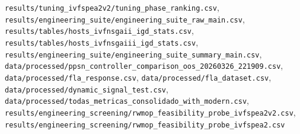 \begin{itemize}[nosep]
\texttt{results/\allowbreak{}tuning\_\allowbreak{}ivfspea2v2/\allowbreak{}tuning\_\allowbreak{}phase\_\allowbreak{}ranking.csv}, \texttt{results/\allowbreak{}engineering\_\allowbreak{}suite/\allowbreak{}engineering\_\allowbreak{}suite\_\allowbreak{}raw\_\allowbreak{}main.csv}, \texttt{results/\allowbreak{}tables/\allowbreak{}hosts\_\allowbreak{}ivfnsgaii\_\allowbreak{}igd\_\allowbreak{}stats.csv}, \texttt{results/\allowbreak{}tables/\allowbreak{}hosts\_\allowbreak{}ivfnsgaiii\_\allowbreak{}igd\_\allowbreak{}stats.csv}, \texttt{results/\allowbreak{}engineering\_\allowbreak{}suite/\allowbreak{}engineering\_\allowbreak{}suite\_\allowbreak{}summary\_\allowbreak{}main.csv}, \texttt{data/\allowbreak{}processed/\allowbreak{}ppsn\_\allowbreak{}controller\_\allowbreak{}comparison\_\allowbreak{}oos\_\allowbreak{}20260326\_\allowbreak{}221909.csv}, \texttt{data/\allowbreak{}processed/\allowbreak{}fla\_\allowbreak{}response.csv}, \texttt{data/\allowbreak{}processed/\allowbreak{}fla\_\allowbreak{}dataset.csv}, \texttt{data/\allowbreak{}processed/\allowbreak{}dynamic\_\allowbreak{}signal\_\allowbreak{}test.csv}, \texttt{data/\allowbreak{}processed/\allowbreak{}todas\_\allowbreak{}metricas\_\allowbreak{}consolidado\_\allowbreak{}with\_\allowbreak{}modern.csv}, \texttt{results/\allowbreak{}engineering\_\allowbreak{}screening/\allowbreak{}rwmop\_\allowbreak{}feasibility\_\allowbreak{}probe\_\allowbreak{}ivfspea2v2.csv}, \texttt{results/\allowbreak{}engineering\_\allowbreak{}screening/\allowbreak{}rwmop\_\allowbreak{}feasibility\_\allowbreak{}probe\_\allowbreak{}ivfspea2.csv}

\end{itemize}
